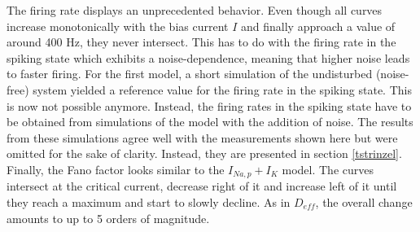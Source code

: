 \documentclass[12pt,a4paper]{article}
\begin{document}
The firing rate displays an unprecedented behavior. Even though all curves increase monotonically with the bias current $I$ and finally approach a value of around 400 Hz, they never intersect. This has to do with the firing rate in the spiking state which exhibits a noise-dependence, meaning that higher noise leads to faster firing. For the first model, a short simulation of the undisturbed (noise-free) system yielded a reference value for the firing rate in the spiking state. This is now not possible anymore. Instead, the firing rates in the spiking state have to be obtained from simulations of the model with the addition of noise. The results from these simulations agree well with the measurements shown here but were omitted for the sake of clarity. Instead, they are presented in section \ref{tstrinzel}.\\
Finally, the Fano factor looks similar to the $I_{Na,p}+I_K$ model. The curves intersect at the critical current, decrease right of it and increase left of it until they reach a maximum and start to slowly decline. As in $D_{eff}$, the overall change amounts to up to 5 orders of magnitude.

\end{document}
